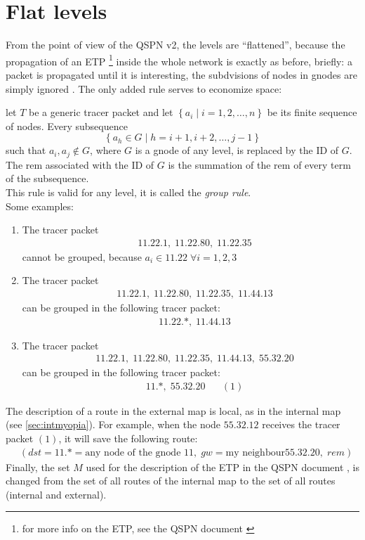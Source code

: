 \documentclass[a4paper]{article}
\newcommand{\T}[1]{\textrm{#1}}
\newcommand{\pgra}[1]{\left\{#1\right\}}
\newcommand{\eal}[1]{{\begin{align*} #1 \end{align*}}}
\def\'{{\;\;\;}}
\begin{document}
\section{Flat levels}
\label{sec:flat}
From the point of view of the QSPN v2, the levels are ``flattened'', because
the propagation of an ETP \footnote{for more info on the ETP,
see the QSPN document \cite{qspndoc}} inside the whole network is exactly as
before, briefly: a packet is propagated until it is interesting, the
subdvisions of nodes in gnodes are simply ignored . The only
added rule serves to economize space: 

let $T$ be a generic tracer packet and let $\pgra{a_i\;|\;i=1,2,\dots,n}$ be its finite sequence of nodes.
Every subsequence \[\pgra{a_h\in G\;|\;h=i+1,i+2,\dots,j-1}\]
such that $a_i,a_j\notin G$, where $G$ is a gnode of any level, is replaced by
the ID of $G$. The rem associated with the ID of $G$ is the summation of the
rem of every term of the subsequence.\\
This rule is valid for any level, it is called the \emph{group rule}.\\
Some examples:
\begin{enumerate}
	\item The tracer packet
		\eal{&11.22.1,\;11.22.80,\;11.22.35}
		cannot be grouped, because $a_i\in 11.22\;\forall i =1,2,3$
	\item The tracer packet
		\eal{&11.22.1,\;11.22.80,\;11.22.35,\;11.44.13}
		can be grouped in the following tracer packet:
		\eal{&11.22.*,\;11.44.13}
	\item The tracer packet
		\eal{&11.22.1,\;11.22.80,\;11.22.35,\;11.44.13,\;55.32.20}
		can be grouped in the following tracer packet:
		\eal{&11.*,\;55.32.20\'\'(1)}
\end{enumerate}
The description of a route in the external map is local, as in the internal
map (see \ref{sec:intmyopia}). For example, when the node $55.32.12$ receives
the tracer packet $(1)$, it will save the following route:
\eal{&(dst=11.*=\T{any node of the gnode $11$},\;gw=\T{my neighbour
$55.32.20$},\;rem)
}
Finally, the set $M$ used for the description of the ETP in the QSPN document
\cite{qspndoc}, is changed from the set of all routes of the internal map to
the set of all routes (internal and external).\\
\end{document}
